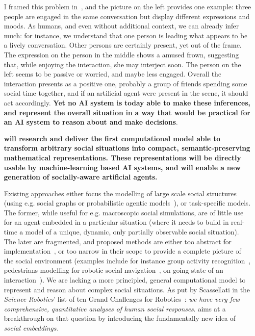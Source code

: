 \noindent I framed this problem in~\cite{webb2021framing}, and the picture on
the left provides one example: three people are engaged in the same conversation
but display different expressions and moods.  As humans, and even without
additional context, we can already infer much: for instance, we understand that
one person is leading what appears to be a lively conversation.  Other persons
are certainly present, yet out of the frame. The expression on the person in the
middle shows a amused frown, suggesting that, while enjoying the interaction,
she may interject soon. The person on the left seems to be passive or worried,
and maybe less engaged.  Overall the interaction presents as a positive one,
probably a group of friends spending some social time together, and if an
artificial agent were present in the scene, it should act accordingly.
\textbf{Yet no AI system is today able to make these inferences, and represent
the overall situation in a way that would be practical for an AI system to
reason about and make decisions}.

\begin{framed}

\bf\noindent \project will research and deliver the first computational model
able to transform arbitrary social situations into compact,
semantic-preserving mathematical representations. These representations will
be directly usable by machine-learning based AI systems, and will enable a
new generation of socially-aware artificial agents.

\end{framed}

Existing approaches either focus the modelling of large scale social structures
(using e.g. social graphs or probabilistic agentic
models~\cite{nunes2014social}), or task-specific models. The former, while
useful for e.g. macroscopic social simulations, are of little use for an agent
embedded in a particular situation (where it needs to build in real-time a model
of a unique, dynamic, only partially observable social situation). The later are
fragmented, and proposed methods are either too abstract for
implementation~\cite{gordon2016commonsense}, or too narrow in their scope to
provide a complete picture of the social environment (examples include for
instance group activity recognition~\cite{shu2017cern,wu2019learning},
pedestrians modelling for robotic social navigation~\cite{alahi2016social},
on-going state of an interaction~\cite{garcía2020explainable}). We are lacking a
more principled, general computational model to represent and reason about
complex social situations. As put by Scassellati in the \emph{Science Robotics}'
list of ten Grand Challenges for Robotics~\cite{yang2018grand}: \emph{we have
very few comprehensive, quantitative analyses of human social responses}.
\project aims at a breakthrough on that question by introducing the
fundamentally new idea of \emph{social embeddings}.


